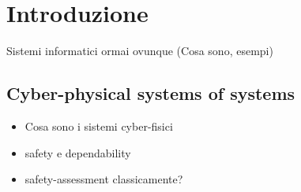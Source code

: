 \chapter{Introduzione}

Sistemi informatici ormai ovunque (Cosa sono, esempi)

\section{Cyber-physical systems of systems}

\begin{itemize}
	\item Cosa sono i sistemi cyber-fisici
	\item safety e dependability
	\item safety-assessment classicamente?
\end{itemize}
